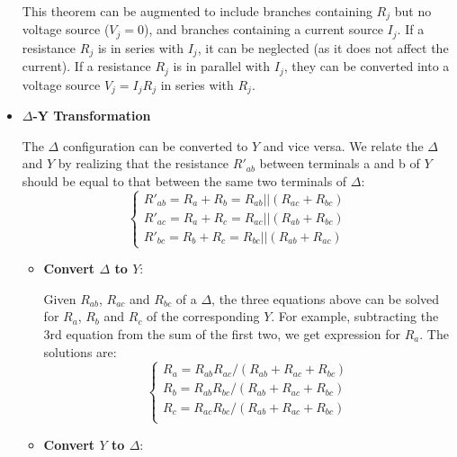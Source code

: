 \documentclass{article}
\begin{document}
\begin{itemize}
\begin{comment}
\end{comment}


This theorem can be augmented to include branches containing $R_j$ but no
voltage source ($V_j=0$), and branches containing a current source $I_j$. If 
a resistance $R_j$ is in series with $I_j$, it can be neglected (as it does
not affect the current). If a resistance $R_j$ is in parallel with $I_j$, 
they can be converted into a voltage source $V_j=I_jR_j$ in series with $R_j$. 


\item {\bf $\Delta$-Y Transformation}


The $\Delta$ configuration can be converted to $Y$ and vice versa. We
relate the $\Delta$ and $Y$ by realizing that the resistance $R'_{ab}$
between terminals a and b of $Y$ should be equal to that between the
same two terminals of $\Delta$:
\begin{equation} 
  \left\{ \begin{array}{rr}
    R'_{ab}=R_a+R_b=R_{ab}||(R_{ac}+R_{bc}) \\
    R'_{ac}=R_a+R_c=R_{ac}||(R_{ab}+R_{bc}) \\
    R'_{bc}=R_b+R_c=R_{bc}||(R_{ab}+R_{ac}) \end{array} \right. 
\end{equation}
\begin{itemize}
  \item {\bf Convert $\Delta$ to $Y$}: 

    Given $R_{ab}$, $R_{ac}$ and $R_{bc}$ of a $\Delta$, the three equations 
    above can be solved for $R_a$, $R_b$ and $R_c$ of the corresponding $Y$. 
    For example, subtracting the 3rd equation from the sum of the first two, 
    we get expression for $R_a$. The solutions are:
    \begin{equation} 
      \left\{ \begin{array}{rr}
        R_a=R_{ab}R_{ac}/(R_{ab}+R_{ac}+R_{bc}) \\
        R_b=R_{ab}R_{bc}/(R_{ab}+R_{ac}+R_{bc}) \\
        R_c=R_{ac}R_{bc}/(R_{ab}+R_{ac}+R_{bc}) \\
      \end{array} \right. 
    \end{equation}

  \item {\bf Convert $Y$ to $\Delta$}: 


\end{itemize}
\end{itemize}
\end{document}
